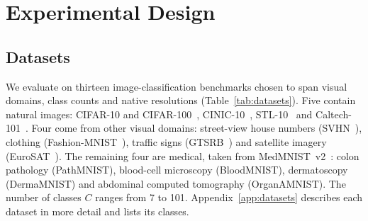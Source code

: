 \documentclass[review,number,sort&compress]{elsarticle}
\theoremstyle{definition}
\begin{document}
\section{Experimental Design}
\label{sec:experimental-design}

\subsection{Datasets}
\label{sec:datasets}

We evaluate on thirteen image-classification benchmarks chosen to span
visual domains, class counts and native resolutions
(Table~\ref{tab:datasets}). Five contain natural images: CIFAR-10 and
CIFAR-100~\citep{krizhevsky2009learning}, CINIC-10~\citep{darlow2018cinic},
STL-10~\citep{coates2011analysis} and Caltech-101~\citep{feifei2004learning}.
Four come from other visual domains: street-view house numbers
(SVHN~\citep{netzer2011reading}), clothing
(Fashion-MNIST~\citep{xiao2017fashion}), traffic signs
(GTSRB~\citep{stallkamp2012man}) and satellite imagery
(EuroSAT~\citep{helber2019eurosat}). The remaining four are medical,
taken from MedMNIST~v2~\citep{yang2023medmnist}: colon pathology
(PathMNIST), blood-cell microscopy (BloodMNIST), dermatoscopy (DermaMNIST)
and abdominal computed tomography (OrganAMNIST). The number of classes
$C$ ranges from 7 to 101. Appendix~\ref{app:datasets} describes each
dataset in more detail and lists its classes.
\end{document}
